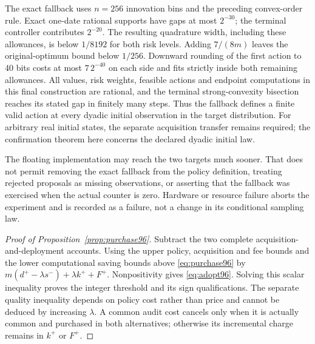 The exact fallback uses $n=256$ innovation bins and the preceding convex-order rule. Exact one-date rational supports have gaps at most $2^{-30}$; the terminal controller contributes $2^{-20}$. The resulting quadrature width, including these allowances, is below $1/8192$ for both risk levels. Adding $7/(8m)$ leaves the original-optimum bound below $1/256$. Downward rounding of the first action to 40 bits costs at most $7\,2^{-40}$ on each side and fits strictly inside both remaining allowances. All values, risk weights, feasible actions and endpoint computations in this final construction are rational, and the terminal strong-convexity bisection reaches its stated gap in finitely many steps. Thus the fallback defines a finite valid action at every dyadic initial observation in the target distribution. For arbitrary real initial states, the separate acquisition transfer remains required; the confirmation theorem here concerns the declared dyadic initial law.

The floating implementation may reach the two targets much sooner. That does not permit removing the exact fallback from the policy definition, treating rejected proposals as missing observations, or asserting that the fallback was exercised when the actual counter is zero. Hardware or resource failure aborts the experiment and is recorded as a failure, not a change in its conditional sampling law.

\begin{proof}[Proof of Proposition~\ref{prop:purchase96}]
Subtract the two complete acquisition-and-deployment accounts. Using the upper policy, acquisition and fee bounds and the lower computational saving bounds above \eqref{eq:purchase96} by
$m(d^+-\lambda s^-)+\lambda k^++F^+$.
Nonpositivity gives \eqref{eq:adopt96}. Solving this scalar inequality proves the integer threshold and its sign qualifications. The separate quality inequality depends on policy cost rather than price and cannot be deduced by increasing $\lambda$. A common audit cost cancels only when it is actually common and purchased in both alternatives; otherwise its incremental charge remains in $k^+$ or $F^+$.
\end{proof}


